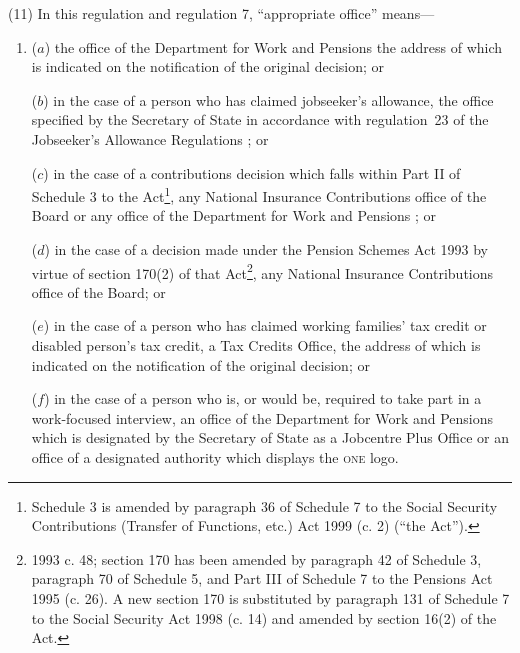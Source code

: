 \documentclass[12pt,a4paper]{article}
\begin{document}
(11) In this regulation and regulation 7, “appropriate office” means---
\begin{enumerate}\item[]
($a$) the office of the 
Department for Work and Pensions  %
the address of which is indicated on the notification of the original decision; or

($b$) in the case of a person who has claimed jobseeker’s allowance, the office specified by the Secretary of State in accordance with regulation~23 of the Jobseeker’s Allowance Regulations%
; or

    ($c$) 
    in the case of a contributions decision which falls within Part II of Schedule 3 to the Act\footnote{\frenchspacing Schedule 3 is amended by paragraph 36 of Schedule 7 to the Social Security Contributions (Transfer of Functions, etc.) Act 1999 (c. 2) (“the Act”).}, any National Insurance Contributions office of the Board or any office of the 
Department for Work and Pensions%
; or

    ($d$) 
    in the case of a decision made under the Pension Schemes Act 1993 by virtue of section 170(2) of that Act\footnote{1993 c. 48; section 170 has been amended by paragraph 42 of Schedule 3, paragraph 70 of Schedule 5, and Part III of Schedule 7 to the Pensions Act 1995 (c. 26). A new section 170 is substituted by paragraph 131 of Schedule 7 to the Social Security Act 1998 (c. 14) and amended by section 16(2) of the Act.}, any National Insurance Contributions office of the Board;
or

($e$) in the case of a person who has claimed working families' tax credit or disabled person’s tax credit, a Tax Credits Office, the address of which is indicated on the notification of the original decision;
or


($f$) in the case of a person who is, or would be, required to take part in a work-focused interview, an office of the Department for Work and Pensions which is designated by the Secretary of State as a Jobcentre Plus Office or an office of a designated authority which displays the \textsc{\lowercase{ONE}} logo.
\end{enumerate}
\end{document}
